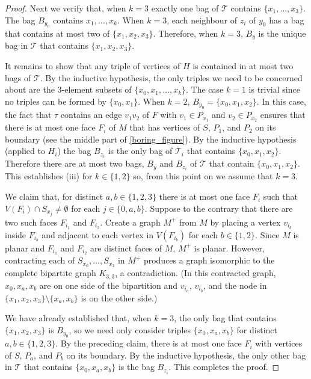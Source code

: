 \documentclass{patmorin}
\theoremstyle{plain}
\theoremstyle{definition}
\begin{document}
\begin{proof}
  Next we verify that, when $k=3$ exactly one bag of $\mathcal{T}$ contains $\{x_1,\ldots,x_3\}$.  The bag $B_{y_0}$ contains $x_1,\ldots,x_k$. When $k=3$, each neighbour of $z_i$ of $y_0$ has a bag that contains at most two of $\{x_1,x_2,x_3\}$.  Therefore, when $k=3$, $B_y$ is the unique bag in $\mathcal{T}$ that contains $\{x_1,x_2,x_3\}$.

  It remains to show that any triple of vertices of $H$ is contained in at most two bags of $\mathcal{T}$. By the inductive hypothesis, the only triples we need to be concerned about are the $3$-element subsets of  $\{x_0,x_1,\ldots,x_k\}$. The case $k=1$ is trivial since no triples can be formed by $\{x_0,x_1\}$.  When $k=2$, $B_{y_0}=\{x_0,x_1,x_2\}$.  In this case, the fact that $\tau$ contains an edge $v_1v_2$ of $F$ with $v_1\in P_{x_1}$ and $v_2\in P_{x_2}$ ensures that there is at most one face $F_i$ of $M$ that has vertices of $S$, $P_1$, and $P_2$ on its boundary  (see the middle part of \cref{boring_figure}).  By the inductive hypothesis (applied to $H_i$) the bag $B_{z_i}$ is the only bag of $\mathcal{T}_i$ that contains $\{x_0,x_1,x_2\}$.  Therefore there are at most two bags, $B_y$ and $B_{z_i}$ of $\mathcal{T}$ that contain $\{x_0,x_1,x_2\}$.  This establishes (iii) for $k\in\{1,2\}$ so, from this point on we assume that $k=3$.

  We claim that, for distinct $a,b\in \{1,2,3\}$ there is at most one face $F_i$ such that $V(F_i)\cap S_{x_j}\neq\emptyset$ for each $j\in\{0,a,b\}$.  Suppose to the contrary that there are two such faces $F_{i_1}$ and $F_{i_2}$.  Create a graph $M^+$ from $M$ by placing a vertex $v_{i_b}$ inside $F_{i_b}$ and adjacent to each vertex in $V(F_{i_b})$ for each $b\in\{1,2\}$.  Since $M$ is planar and $F_{i_1}$ and $F_{i_2}$ are distinct faces of $M$, $M^+$ is planar.  However, contracting each of $S_{x_0},\ldots,S_{x_3}$ in $M^+$ produces a graph isomorphic to the complete bipartite graph $K_{3,3}$, a contradiction.  (In this contracted graph, $x_0,x_a,x_b$ are on one side of the bipartition and $v_{i_a}$, $v_{i_b}$, and the node in $\{x_1,x_2,x_3\}\setminus\{x_a,x_b\}$ is on the other side.)

  We have already established that, when $k=3$, the only bag that contains $\{x_1,x_2,x_3\}$ is $B_{y_0}$, so we need only consider triples $\{x_0,x_a,x_b\}$ for distinct $a,b\in\{1,2,3\}$. By the preceding claim, there is at most one face $F_i$ with vertices of $S$, $P_a$, and $P_b$ on its boundary.  By the inductive hypothesis, the only other bag in $\mathcal{T}$ that contains $\{x_0,x_a,x_b\}$ is the bag $B_{z_i}$.  This completes the proof.
\end{proof}
\end{document}
